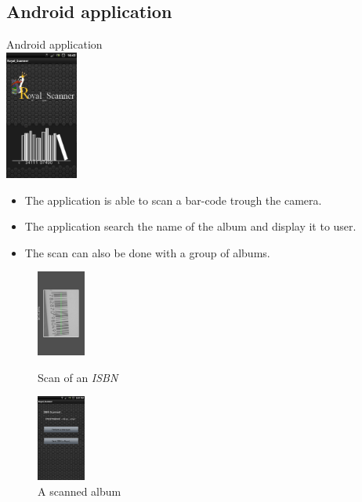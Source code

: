 \documentclass{beamer}
\begin{document}
\subsection{Android application}
\begin{frame}
\begin{center}
\huge{Android application} \\ 
\includegraphics[width=90px]{figs/android_main.png}
\end{center}
\end{frame}

\begin{frame}
\begin{itemize}
\item The application is able to scan a bar-code trough the camera.
\pause \item The application search the name of the album and display it to user.
\pause \item The scan can also be done with a group of albums. 
\end{itemize}
\begin{figure}[h!]
 {
	\begin{minipage}[b]{0.4\linewidth}
	\centering \includegraphics[width=60px, scale=1]{figs/android_isbn.png}
	\caption{Scan of an \emph{ISBN}}
	\end{minipage}
}
 {
	\begin{minipage}[b]{0.4\linewidth}
	\centering \includegraphics[width=60px, scale=1]{figs/android_name.png}
	\caption{A scanned album}
	\end{minipage}
}
\end{figure}
\end{frame}
\end{document}
